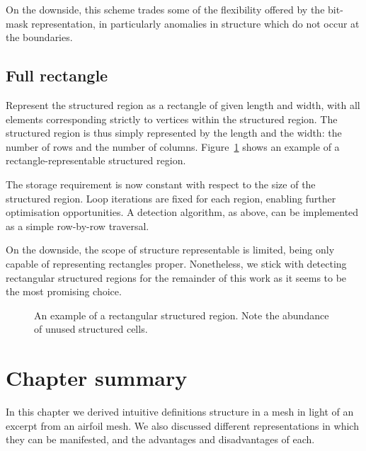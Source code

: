 On the downside, this scheme trades some of the flexibility offered by the bit-mask representation, in particularly anomalies in structure which do not occur at the boundaries.


\subsection{Full rectangle}

Represent the structured region as a rectangle of given length and width, with all elements corresponding strictly to vertices within the structured region. The structured region is thus simply represented by the length and the width: the number of rows and the number of columns. Figure~\ref{fig:rectangle} shows an example of a rectangle-representable structured region.

The storage requirement is now constant with respect to the size of the structured region.
Loop iterations are fixed for each region, enabling further optimisation opportunities.
A detection algorithm, as above, can be implemented as a simple row-by-row traversal.

On the downside, the scope of structure representable is limited, being only capable of representing rectangles proper. Nonetheless, we stick with detecting rectangular structured regions for the remainder of this work as it seems to be the most promising choice.

\begin{figure}
\drawmatrix[cell wd=0.8, cell ht=0.8]{\bitmapmatrix}
\caption{An example of a rectangular structured region. Note the abundance of unused structured cells.}
\label{fig:rectangle}
\end{figure}

\section{Chapter summary}
In this chapter we derived intuitive definitions structure in a mesh in light of an excerpt from an airfoil mesh. We also discussed different representations in which they can be manifested, and the advantages and disadvantages of each.